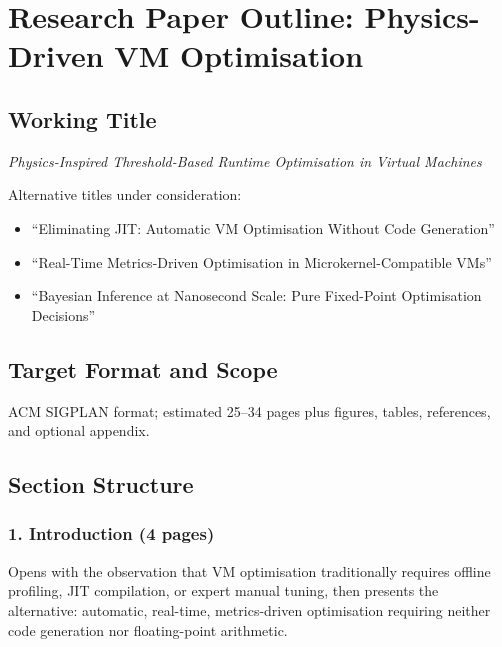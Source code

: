 
\section{Research Paper Outline: Physics-Driven VM Optimisation}
\label{sec:research-outline}

\subsection{Working Title}

\textit{Physics-Inspired Threshold-Based Runtime Optimisation in Virtual Machines}

Alternative titles under consideration:
\begin{itemize}
  \item ``Eliminating JIT: Automatic VM Optimisation Without Code Generation''
  \item ``Real-Time Metrics-Driven Optimisation in Microkernel-Compatible VMs''
  \item ``Bayesian Inference at Nanosecond Scale: Pure Fixed-Point Optimisation Decisions''
\end{itemize}

\subsection{Target Format and Scope}

ACM SIGPLAN format; estimated 25--34 pages plus figures, tables, references,
and optional appendix.

\subsection{Section Structure}

\subsubsection{1. Introduction (4 pages)}

Opens with the observation that VM optimisation traditionally requires
offline profiling, JIT compilation, or expert manual tuning, then presents
the alternative: automatic, real-time, metrics-driven optimisation requiring
neither code generation nor floating-point arithmetic.

